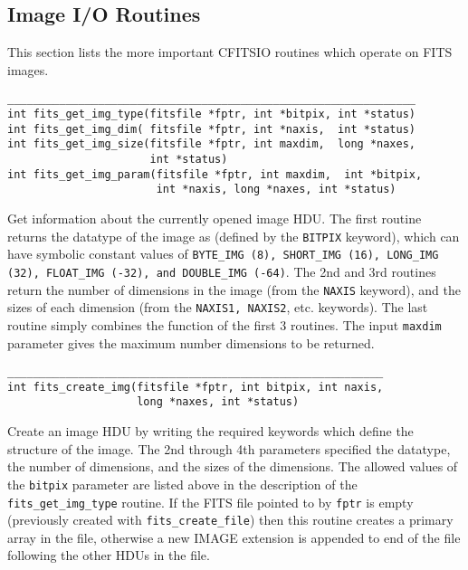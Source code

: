 \documentclass[11pt]{article}
\begin{document}
\newpage
\subsection{Image I/O Routines}

This section lists the more important CFITSIO routines which operate on
FITS images.

\begin{verbatim}
_______________________________________________________________
int fits_get_img_type(fitsfile *fptr, int *bitpix, int *status)
int fits_get_img_dim( fitsfile *fptr, int *naxis,  int *status)
int fits_get_img_size(fitsfile *fptr, int maxdim,  long *naxes,
                      int *status)
int fits_get_img_param(fitsfile *fptr, int maxdim,  int *bitpix,
                       int *naxis, long *naxes, int *status)
\end{verbatim}

Get information about the currently opened image HDU. The first routine
returns the datatype of the image as (defined by the {\tt BITPIX}
keyword), which can have symbolic constant values of {\tt BYTE\_IMG
(8), SHORT\_IMG (16), LONG\_IMG (32), FLOAT\_IMG (-32), and DOUBLE\_IMG
(-64)}.  The 2nd and 3rd routines return the number of dimensions in
the image (from the {\tt NAXIS} keyword), and the sizes of each
dimension (from the {\tt NAXIS1, NAXIS2}, etc. keywords).  The last
routine simply combines the function of the first 3 routines.  The
input {\tt maxdim} parameter gives the maximum number dimensions to be
returned.
  
\begin{verbatim}
__________________________________________________________
int fits_create_img(fitsfile *fptr, int bitpix, int naxis, 
                    long *naxes, int *status)
\end{verbatim}

Create an image HDU by writing the required keywords which define the
structure of the image.  The 2nd through 4th parameters  specified the
datatype, the number of dimensions, and the sizes of the dimensions.
The allowed values of the {\tt bitpix} parameter are listed above in
the description of the {\tt fits\_get\_img\_type} routine.  If the FITS
file pointed to by {\tt fptr} is empty (previously created with
{\tt fits\_create\_file}) then this routine creates a primary array in
the file, otherwise a new IMAGE extension is appended to end of the
file following the other HDUs in the file.
\end{document}
